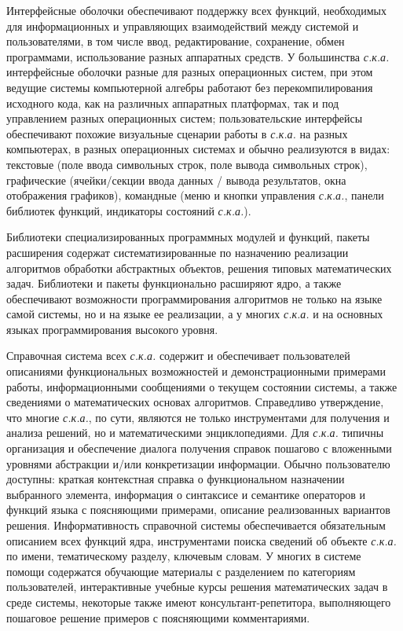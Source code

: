 Интерфейсные оболочки обеспечивают поддержку всех функций, необходимых для информационных и управляющих взаимодействий между системой и пользователями, в том числе ввод, редактирование, сохранение, обмен программами, использование разных аппаратных средств. У большинства \textit{с.к.а.} интерфейсные оболочки разные для разных операционных систем, при этом ведущие системы компьютерной алгебры работают без перекомпилирования исходного кода, как на различных аппаратных платформах, так и под управлением разных операционных систем; пользовательские интерфейсы обеспечивают похожие визуальные сценарии работы в \textit{с.к.а.} на разных компьютерах, в разных операционных системах и обычно реализуются в видах: текстовые (поле ввода символьных строк, поле вывода символьных строк), графические (ячейки/секции ввода данных / вывода результатов, окна отображения графиков), командные (меню и кнопки управления \textit{с.к.а.}, панели библиотек функций, индикаторы состояний \textit{с.к.а.}).

Библиотеки специализированных программных модулей и функций, пакеты расширения содержат систематизированные по назначению реализации алгоритмов обработки абстрактных объектов, решения типовых математических задач. Библиотеки и пакеты функционально расширяют ядро, а также обеспечивают возможности программирования алгоритмов не только на языке самой системы, но и на языке ее реализации, а у многих \textit{с.к.а.} и на основных языках программирования высокого уровня.

Справочная система всех \textit{с.к.а.} содержит и обеспечивает пользователей описаниями функциональных возможностей и демонстрационными примерами работы, информационными сообщениями о текущем состоянии системы, а также сведениями о математических основах алгоритмов. Справедливо утверждение, что многие \textit{с.к.а.}, по сути, являются не только инструментами для получения и анализа решений, но и математическими энциклопедиями. Для \textit{с.к.а.} типичны организация и обеспечение диалога получения справок пошагово с вложенными уровнями абстракции и/или конкретизации информации. Обычно пользователю доступны: краткая контекстная справка о функциональном назначении выбранного элемента, информация о синтаксисе и семантике операторов и функций языка с поясняющими примерами, описание реализованных вариантов решения. Информативность справочной системы обеспечивается обязательным описанием всех функций ядра, инструментами поиска сведений об объекте \textit{с.к.а.} по имени, тематическому разделу, ключевым словам. У многих в системе помощи содержатся обучающие материалы с разделением по категориям пользователей, интерактивные учебные курсы решения математических задач в среде системы, некоторые также имеют консультант-репетитора, выполняющего пошаговое решение примеров с поясняющими комментариями.

